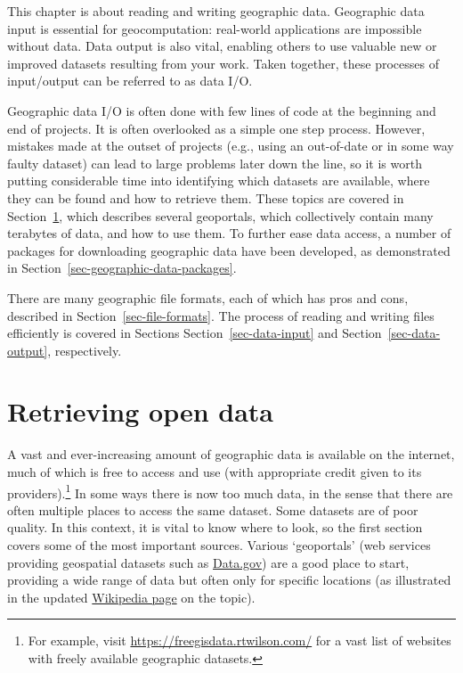 \documentclass[
  letterpaper,
]{krantz}
\begin{document}
This chapter is about reading and writing geographic data. Geographic
data input is essential for geocomputation: real-world applications are
impossible without data. Data output is also vital, enabling others to
use valuable new or improved datasets resulting from your work. Taken
together, these processes of input/output can be referred to as data
I/O.

Geographic data I/O is often done with few lines of code at the
beginning and end of projects. It is often overlooked as a simple one
step process. However, mistakes made at the outset of projects (e.g.,
using an out-of-date or in some way faulty dataset) can lead to large
problems later down the line, so it is worth putting considerable time
into identifying which datasets are available, where they can be found
and how to retrieve them. These topics are covered in
Section~\ref{sec-retrieving-open-data}, which describes several
geoportals, which collectively contain many terabytes of data, and how
to use them. To further ease data access, a number of packages for
downloading geographic data have been developed, as demonstrated in
Section~\ref{sec-geographic-data-packages}.

There are many geographic file formats, each of which has pros and cons,
described in Section~\ref{sec-file-formats}. The process of reading and
writing files efficiently is covered in Sections
Section~\ref{sec-data-input} and Section~\ref{sec-data-output},
respectively.

\section{Retrieving open data}\label{sec-retrieving-open-data}

A vast and ever-increasing amount of geographic data is available on the
internet, much of which is free to access and use (with appropriate
credit given to its providers).\footnote{For example, visit
  \url{https://freegisdata.rtwilson.com/} for a vast list of websites
  with freely available geographic datasets.} In some ways there is now
too much data, in the sense that there are often multiple places to
access the same dataset. Some datasets are of poor quality. In this
context, it is vital to know where to look, so the first section covers
some of the most important sources. Various `geoportals' (web services
providing geospatial datasets such as
\href{https://catalog.data.gov/dataset?metadata_type=geospatial}{Data.gov})
are a good place to start, providing a wide range of data but often only
for specific locations (as illustrated in the updated
\href{https://en.wikipedia.org/wiki/Geoportal}{Wikipedia page} on the
topic).
\end{document}
